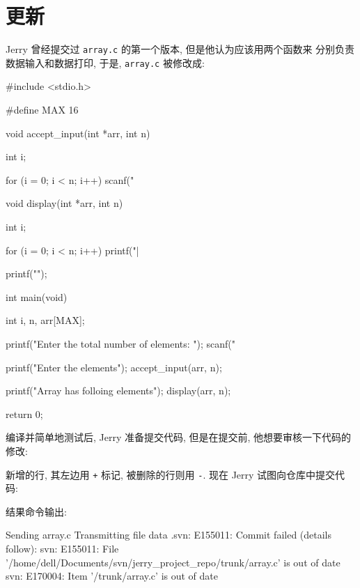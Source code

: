 \documentclass[nofonts, oneside]{ctexbook}
\newcommand\svn{\texttt{svn}}
\newcommand\svnci{\texttt{commit}}
\newcommand\svndf{\texttt{diff}}
\begin{document}
\chapter{更新}
\label{chap:update_process}

Jerry 曾经提交过 \texttt{array.c} 的第一个版本, 但是他认为应该用两个函数来
分别负责数据输入和数据打印, 于是, \texttt{array.c} 被修改成:
\begin{ccode}
#include <stdio.h>

#define MAX 16

void accept_input(int *arr, int n)
{
	int i;

	for (i = 0; i < n; i++)
		scanf("%
}

void display(int *arr, int n)
{
	int i;

	for (i = 0; i < n; i++)
		printf("|%

	printf("\n");
}

int main(void)
{
	int i, n, arr[MAX];

	printf("Enter the total number of elements: ");
	scanf("%

	printf("Enter the elements\n");
	accept_input(arr, n);

	printf("Array has folloing elements\n");
	display(arr, n);

	return 0;
}
\end{ccode}

编译并简单地测试后, Jerry 准备提交代码, 但是在提交前, 他想要审核一下代码的
修改:
新增的行, 其左边用 \texttt{+} 标记, 被删除的行则用 \texttt{-}. 现在 Jerry
试图向仓库中提交代码:
结果命令输出:
\begin{svnshell}
Sending        array.c
Transmitting file data .svn: E155011: Commit failed (details follow):
svn: E155011: File '/home/dell/Documents/svn/jerry_project_repo/trunk/array.c' is out of date
svn: E170004: Item '/trunk/array.c' is out of date
\end{svnshell}
\end{document}
